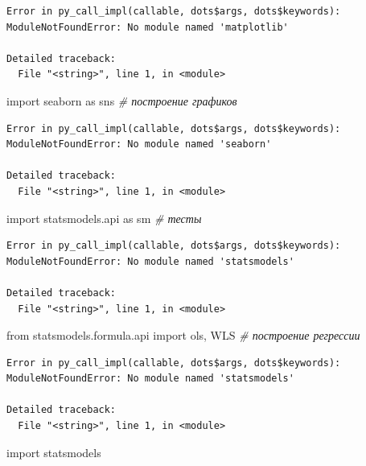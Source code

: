 \documentclass[]{book}
\newenvironment{Shaded}{\begin{snugshade}}{\end{snugshade}}
\newcommand{\CommentTok}[1]{\textcolor[rgb]{0.56,0.35,0.01}{\textit{#1}}}
\newcommand{\ImportTok}[1]{#1}
\newcommand{\NormalTok}[1]{#1}
\begin{document}
\begin{verbatim}
Error in py_call_impl(callable, dots$args, dots$keywords): ModuleNotFoundError: No module named 'matplotlib'

Detailed traceback: 
  File "<string>", line 1, in <module>
\end{verbatim}

\begin{Shaded}
\begin{Highlighting}[]
\ImportTok{import}\NormalTok{ seaborn }\ImportTok{as}\NormalTok{ sns }\CommentTok{# построение графиков}
\end{Highlighting}
\end{Shaded}

\begin{verbatim}
Error in py_call_impl(callable, dots$args, dots$keywords): ModuleNotFoundError: No module named 'seaborn'

Detailed traceback: 
  File "<string>", line 1, in <module>
\end{verbatim}

\begin{Shaded}
\begin{Highlighting}[]
\ImportTok{import}\NormalTok{ statsmodels.api }\ImportTok{as}\NormalTok{ sm }\CommentTok{# тесты}
\end{Highlighting}
\end{Shaded}

\begin{verbatim}
Error in py_call_impl(callable, dots$args, dots$keywords): ModuleNotFoundError: No module named 'statsmodels'

Detailed traceback: 
  File "<string>", line 1, in <module>
\end{verbatim}

\begin{Shaded}
\begin{Highlighting}[]
\ImportTok{from}\NormalTok{ statsmodels.formula.api }\ImportTok{import}\NormalTok{ ols, WLS }\CommentTok{# построение регрессии}
\end{Highlighting}
\end{Shaded}

\begin{verbatim}
Error in py_call_impl(callable, dots$args, dots$keywords): ModuleNotFoundError: No module named 'statsmodels'

Detailed traceback: 
  File "<string>", line 1, in <module>
\end{verbatim}

\begin{Shaded}
\begin{Highlighting}[]
\ImportTok{import}\NormalTok{ statsmodels}
\end{Highlighting}
\end{Shaded}
\end{document}
